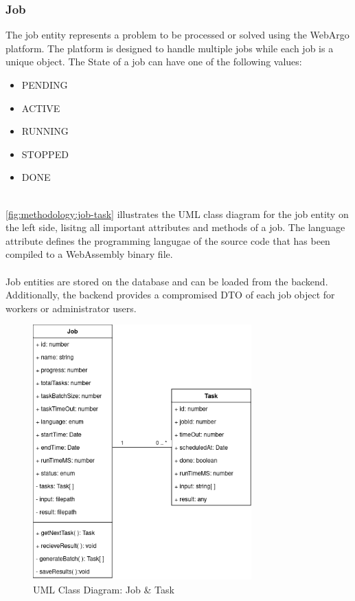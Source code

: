 \subsubsection{Job}
The job entity represents a problem to be processed or solved using the WebArgo platform. The platform is designed to handle multiple jobs while each job is a unique object. The State of a job can have one of the following values:
\begin{itemize}
  \item PENDING
  \item ACTIVE
  \item RUNNING
  \item STOPPED
  \item DONE
\end{itemize}
~\\
\autoref{fig:methodology:job-task} illustrates the \ac{UML} class diagram for the job entity on the left side, lisitng all important attributes and methods of a job. The language attribute defines the programming langugae of the source code that has been compiled to a WebAssembly binary file.
\\~\\
Job entities are stored on the database and can be loaded from the backend. Additionally, the backend provides a compromised \ac{DTO} of each job object for workers or administrator users.
\clearpage 
\begin{figure}[htbp]
    \centering
    \includegraphics[width=0.75\textwidth]{gfx/figures/Job-Task.png}
    \caption{\acs{UML} Class Diagram: Job \& Task}
    \label{fig:methodology:job-task}
\end{figure}

